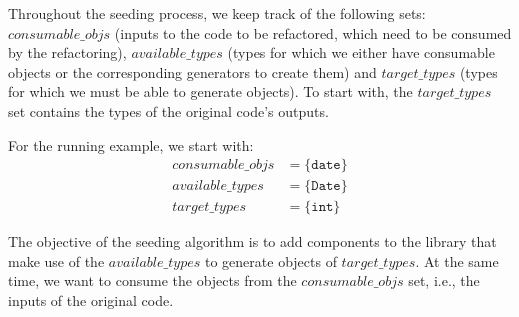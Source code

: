 \documentclass[sigconf,review,anonymous]{acmart}
\begin{document}


Throughout the seeding process, we keep track of the following sets:
$\mathit{consumable\_ objs}$ (inputs to the code to be refactored, which need to be consumed by the refactoring),  
$\mathit{available\_types}$ (types for which we either have consumable objects or the corresponding generators to create them) and 
$\mathit{target\_types}$ (types for which we must be able to generate objects). To start with, the $\mathit{target\_types}$ set
contains the types of the original code's outputs. %

For the running example, we start with:
\[
\begin{aligned}
  \mathit{consumable\_objs} &=  \{\texttt{date}\}\\  
  \mathit{available\_types} &=  \{\texttt{Date}\}\\
  \mathit{target\_types} &= \{\texttt{int}\}
\end{aligned}
\]

%

The objective of the seeding algorithm is to
add components to the library that make use of the $\mathit{available\_types}$ to generate objects
of $\mathit{target\_types}$. At the same time, we want to consume the objects from the
$\mathit{consumable\_objs}$ set, i.e., the inputs of the original code.
\end{document}
